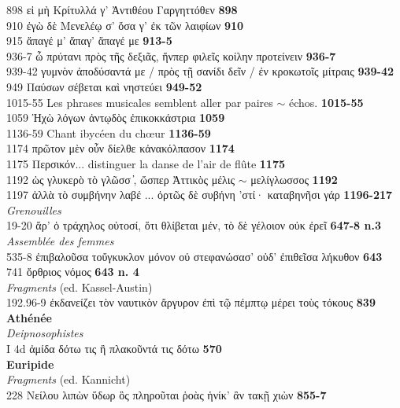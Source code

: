 \documentclass{book}%
\newcommand{\italique}[1]{\textit{#1}}%
\newcommand{\espace}[1]{\hspace{#1}}%
\newlength{\larg}%
\newcommand{\decalageN}[1]{%
\settowidth{\larg}{#1}%
\espace{-\larg}%
}
\newcommand{\Index}[1]{\section*{#1}%
\addcontentsline{toc}{section}{#1}}
\newcommand{\Auteur}[1]{\hspace*{-1.5cm}\textbf{#1} \\}
\newcommand{\livre}[1]{\hspace*{0.5cm}#1\\}
\newcommand{\passage}[3]{\hspace*{1.0cm} #1 \hspace*{1.2cm}\decalageN{#1} #2 \dotfill \hfill	\textbf{#3}\\} %
\begin{document}
\passage{898}{εἰ μὴ Κρίτυλλά γ' Ἀντιθέου Γαργηττόθεν}{898}
\passage{910}{ἐγὼ δὲ Μενελέῳ σ' ὅσα γ' ἐκ τῶν λαιφίων}{910}
\passage{915}{ἄπαγέ μ' ἄπαγ' ἄπαγέ με}{913-5}
\passage{936-7}{ὦ πρύτανι πρὸς τῆς δεξιᾶς, ἥνπερ φιλεῖς κοίλην προτείνειν}{936-7}
\passage{939-42}{γυμνὸν ἀποδύσαντά με / πρὸς τῇ σανίδι δεῖν / ἐν κροκωτοῖς μίτραις}{939-42}
\passage{949}{Παύσων σέβεται καὶ νηστεύει}{949-52}
\passage{1015-55}{Les phrases musicales semblent aller par paires $\sim$ échos.}{1015-55}
\passage{1059}{Ἠχὼ λόγων ἀντῳδὸς ἐπικοκκάστρια}{1059}
\passage{1136-59}{Chant ibycéen du chœur}{1136-59}
\passage{1174}{πρῶτον μὲν οὖν δίελθε κἀνακόλπασον}{1174}
\passage{1175}{Περσικόν... distinguer la danse de l'air de flûte}{1175}
\passage{1192}{ὠς γλυκερὸ τὸ γλῶσσ ̓, ὤσπερ Ἀττικὸς μέλις $\sim$ μελίγλωσσος}{1192}
\passage{1197}{ἀλλὰ τὸ συμβήνην λαβέ ... ὀρτῶς δὲ συβήνη ’στί· καταβηνῆσι γάρ}{1196-217}
\livre{\italique{Grenouilles}}
\passage{19-20}{ἄρ' ὁ τράχηλος οὑτοσί, ὅτι θλίβεται μέν, τὸ δὲ γέλοιον οὐκ ἐρεῖ}{647-8 n.3}
\livre{\italique{Assemblée des femmes}}
\passage{535-8}{ἐπιβαλοῦσα τοὔγκυκλον μόνον οὐ στεφανώσασ’ οὐδ’ ἐπιθεῖσα λήκυθον}{643}
\passage{741}{ὄρθριος νόμος}{643 n. 4}
\livre{\italique{Fragments} (ed. Kassel-Austin)}
\passage{192.96-9}{ἐκδανείζει τὸν ναυτικὸν ἄργυρον ἐπὶ τῷ πέμπτῳ μέρει τοὺς τόκους}{839}
\Auteur{Athénée}
\livre{\italique{Deipnosophistes}}
\passage{I 4d}{ἀμίδα δότω τις ἢ πλακοῦντά τις δότω}{570}
\Auteur{Euripide}
\livre{\italique{Fragments} (ed. Kannicht)}
\passage{228}{Νείλου λιπὼν ὕδωρ ὃς πληροῦται ῥοὰς  ἡνίκ’ ἂν τακῇ χιὼν}{855-7}



























\end{document}
